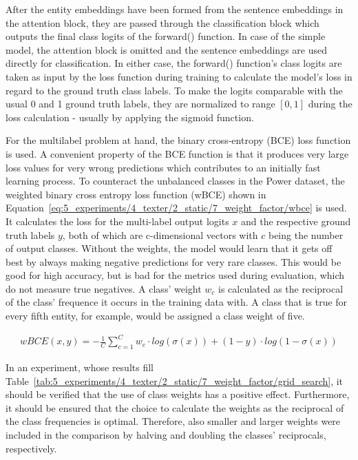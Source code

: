 After the entity embeddings have been formed from the sentence embeddings in the attention block, they are passed through the classification block which outputs the final class logits of the forward() function. In case of the simple model, the attention block is omitted and the sentence embeddings are used directly for classification. In either case, the forward() function's class logits are taken as input by the loss function during training to calculate the model's loss in regard to the ground truth class labels. To make the logits comparable with the usual 0 and 1 ground truth labels, they are normalized to range $[0, 1]$ during the loss calculation - usually by applying the sigmoid function.

For the multilabel problem at hand, the binary cross-entropy (BCE) loss function is used. A convenient property of the BCE function is that it produces very large loss values for very wrong predictions which contributes to an initially fast learning process. To counteract the unbalanced classes in the Power dataset, the weighted binary cross entropy loss function (wBCE) shown in Equation~\ref{eq:5_experiments/4_texter/2_static/7_weight_factor/wbce} is used. It calculates the loss for the multi-label output logits $x$ and the respective ground truth labels $y$, both of which are c-dimensional vectors with $c$ being the number of output classes. Without the weights, the model would learn that it gets off best by always making negative predictions for very rare classes. This would be good for high accuracy, but is bad for the metrics used during evaluation, which do not measure true negatives. A class' weight $w_c$ is calculated as the reciprocal of the class' frequence it occurs in the training data with. A class that is true for every fifth entity, for example, would be assigned a class weight of five.

\begin{align}
    wBCE(x, y) = - \frac{1}{C} \sum_{c = 1}^C w_c \cdot log(\sigma(x)) + (1 - y) \cdot log(1 - \sigma(x))
    \label{eq:5_experiments/4_texter/2_static/7_weight_factor/wbce}
\end{align}

In an experiment, whose results fill Table~\ref{tab:5_experiments/4_texter/2_static/7_weight_factor/grid_search}, it should be verified that the use of class weights has a positive effect. Furthermore, it should be ensured that the choice to calculate the weights as the reciprocal of the class frequencies is optimal. Therefore, also smaller and larger weights were included in the comparison by halving and doubling the classes' reciprocals, respectively.

